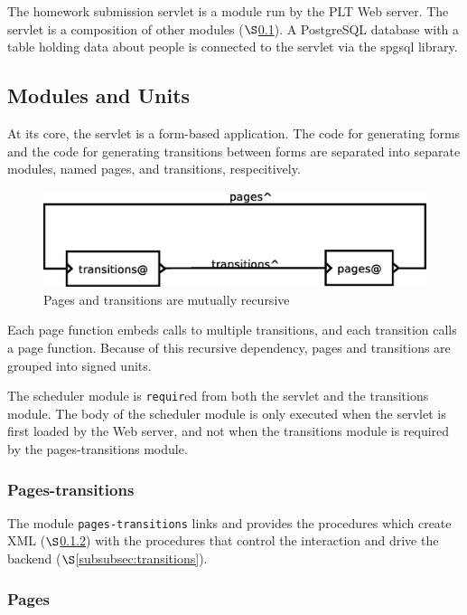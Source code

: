 \documentclass[a4paper]{article}
\begin{document}
The homework submission servlet is a module run by the PLT Web server. The
servlet is a composition of other modules ($\S$\ref{subsec:components}). A
PostgreSQL database with a table holding data about people is connected to the
servlet via the spgsql library.

\subsection{Modules and Units}\label{subsec:components}

At its core, the servlet is a form-based application. The code for generating 
forms and the code for generating transitions between forms are separated into 
separate modules, named pages, and transitions, respecitively.

\begin{figure}[ht]
\centering
\includegraphics[scale=.30]{units.eps}
\caption{Pages and transitions are mutually recursive}
\label{fig:layout}
\end{figure}

Each page function embeds calls to multiple transitions, and each transition
calls a page function. Because of this recursive dependency, pages and 
transitions are grouped into signed units.

The scheduler module is \verb|requir|ed from both the servlet and the
transitions module. The body of the scheduler module is only executed when the
servlet is first loaded by the Web server, and not when the transitions module
is required by the pages-transitions module.

\subsubsection{Pages-transitions}\label{subsubsec:pages-transitions}

The module \verb|pages-transitions| links and provides the procedures which
create XML ($\S$\ref{subsubsec:pages}) with the procedures that control the
interaction and drive the backend ($\S$\ref{subsubsec:transitions}).

\subsubsection{Pages}\label{subsubsec:pages}
\end{document}
